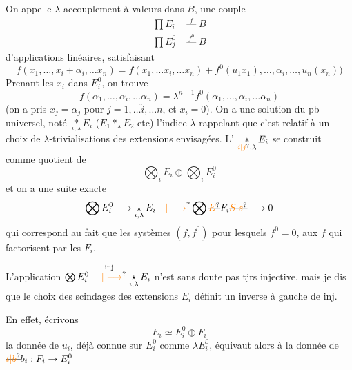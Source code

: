 On appelle $\lambda$-accouplement à valeurs
dans $B$, une couple
\[
\begin{aligned}
\prod E_i &\mathrel{\mathop{\text{---}}\limits^{f}} B\\
\prod E_j^0 &\mathrel{\mathop{\text{---}}\limits^{f^0}} B
\end{aligned}
\]
d'applications  linéaires, satisfaisant
\[
f(x_1,\ldots,x_i+\alpha_i,\ldots x_n)
=f(x_1,\ldots x_i,\ldots x_n)+f^0(u_1x_1),\ldots,\alpha_i,\ldots,u_n(x_n))
\]
Prenant les $x_i$ dans $E_i^0$, on trouve
\[
f(\alpha_1,\ldots,\alpha_i,\ldots\alpha_n)=\lambda^{n-1}f^0(\alpha_1,\ldots,\alpha_i,\ldots\alpha_n)
\]
(on a pris $x_j=\alpha_j$ pour $j=1,\ldots\hat i,\ldots n$, et
$x_i=0$). On a une solution du
pb universel, noté $\mathop{*}\limits_{i,\lambda}E_i$ ($E_1*_\lambda E_2$ etc)
l'indice $\lambda$ rappelant que c'est relatif à un
choix de $\lambda$-trivialisations des extensions
envisagées. L' $\mathop{*}\limits_{\unsure{i|j},\lambda}E_i$ se construit
comme quotient de
\[
\bigotimes_i E_i \oplus \bigotimes_i E_i^0
\]
et on a une suite exacte
\[
\bigotimes E_i^0 \longrightarrow \mathop{\star}\limits_{i,\lambda} E_i \unsure{\text{---}|\longrightarrow} \bigotimes \deleted{\unsure{E}}F_i\deleted{\unsure{S|s}}\longrightarrow 0
\]
qui correspond au fait que les systèmes $(f,f^0)$ pour lesquels $f^0=0$,  aux $f$ qui  factorisent par les $F_i$.

L'application $\bigotimes E_i^0 \mathrel{\overset{\mathrm{inj}}{\unsure{\text{---}|\longrightarrow}}} \mathop{\star}\limits_{i,\lambda} E_i$ n'est sans doute pas tjrs injective, mais je dis que le choix des scindages des extensions $E_i$ définit un inverse à gauche de $\mathrm{inj}$.

En effet, écrivons
\[
E_i \simeq E_i^0\oplus F_i
\]
la donnée de $u_i$, déjà connue sur $E_i^0$ comme $\lambda E_i^0$, équivaut alors à la donnée de $\deleted{\unsure{t|b}}b_i:F_i \to E_i^0$
